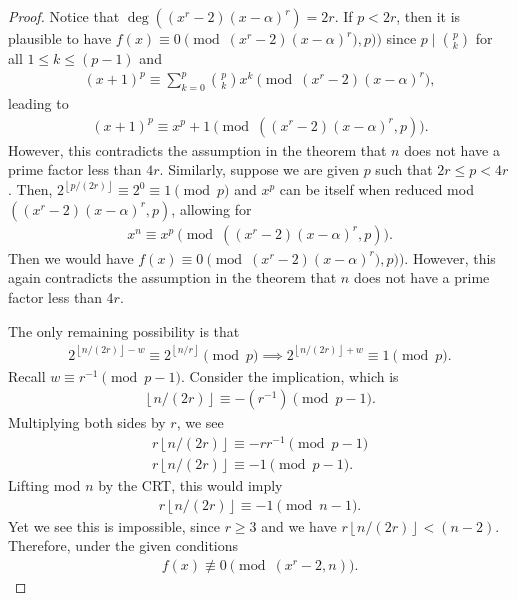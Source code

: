 \documentclass{article}
\theoremstyle{plain}
\theoremstyle{definition}
\newcommand{\floor}[1]{\left\lfloor #1 \right\rfloor}
\begin{document}
\begin{proof}
Notice that $\deg((x^r-2)(x-\alpha)^r) = 2r$. If $p < 2r$, then it is plausible to have $f(x) \equiv 0 \pmod{(x^r-2)(x-\alpha)^r),p)}$ since $p \mid \binom{p}{k}$ for all $1 \leq k \leq (p-1)$ and
\begin{align*}
(x+1)^p \equiv \sum_{k=0}^p \binom{p}{k} x^k \pmod{(x^r-2)(x-\alpha)^r} ,
\end{align*}
leading to
\begin{align*}
(x+1)^p \equiv x^p + 1 \pmod{((x^r-2)(x-\alpha)^r,p)} .
\end{align*}
However, this contradicts the assumption in the theorem that $n$ does not have a prime factor less than $4r$. Similarly, suppose we are given $p$ such that $2r \leq p < 4r$. Then, $2^{\floor{p/(2r)}} \equiv 2^0 \equiv 1 \pmod{p}$ and $x^p$ can be itself when reduced mod $((x^r-2)(x-\alpha)^r,p)$, allowing for
\begin{align*}
x^n \equiv x^p \pmod{((x^r-2)(x-\alpha)^r,p)} .
\end{align*}
Then we would have $f(x) \equiv 0 \pmod{(x^r-2)(x-\alpha)^r),p)}$. However, this again contradicts the assumption in the theorem that $n$ does not have a prime factor less than $4r$.

The only remaining possibility is that
\begin{align*}
    2^{\floor{n/(2r)} - w} \equiv 2^{\floor{n/r}} \pmod{p}
    \implies 2^{\floor{n/(2r)} + w} \equiv 1 \pmod{p} .
\end{align*}
Recall $w \equiv r^{-1} \pmod{p-1}$. Consider the implication, which is
\begin{align*}
    \floor{n/(2r)} \equiv -(r^{-1}) \pmod{p-1} .
\end{align*}
Multiplying both sides by $r$, we see
\begin{align*}
    r \floor{n/(2r)}  \equiv -r r^{-1} \pmod{p-1} \\
    r \floor{n/(2r)} \equiv -1 \pmod{p-1} .
\end{align*}
Lifting mod $n$ by the CRT, this would imply
\begin{align*}
    r \floor{n/(2r)} \equiv -1 \pmod{n-1} .
\end{align*}
Yet we see this is impossible, since $r \geq 3$ and we have $r \floor{n/(2r)} < (n-2)$. Therefore, under the given conditions
\begin{align*}
 f(x) \not\equiv 0 \pmod{(x^r-2, n)} .
\end{align*}
\end{proof}
\end{document}
